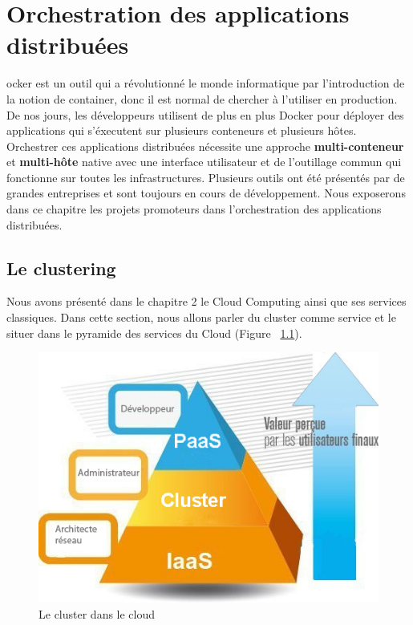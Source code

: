 \chapter{Orchestration des applications distribuées}
\begin{onehalfspace}

ocker est un outil qui a révolutionné le monde informatique par l'introduction de la notion de container, donc il est normal de chercher à l'utiliser en production. De nos jours, les développeurs utilisent de plus en plus Docker pour déployer des applications qui s'éxecutent sur plusieurs conteneurs et plusieurs hôtes. Orchestrer ces applications distribuées nécessite une approche \textbf{multi-conteneur} et \textbf{multi-hôte} native avec une interface utilisateur et de l'outillage commun qui fonctionne sur toutes les infrastructures. Plusieurs outils ont été présentés par de grandes entreprises et sont toujours en cours de développement. Nous exposerons dans ce chapitre les projets promoteurs dans l'orchestration des applications distribuées.

\newpage

\section{Le clustering}

Nous avons présenté dans le chapitre 2 le Cloud Computing ainsi que ses services classiques. Dans cette section, nous allons parler du cluster comme service et le situer dans le pyramide des services du Cloud (Figure ~\ref{fig:pyramide-cluster}).

\begin{figure}[H]
\centering
\includegraphics [scale=0.7]{chapitre3/assets/pyramide}
\caption{Le cluster dans le cloud}
\label{fig:pyramide-cluster}
\end{figure}


\end{onehalfspace}
